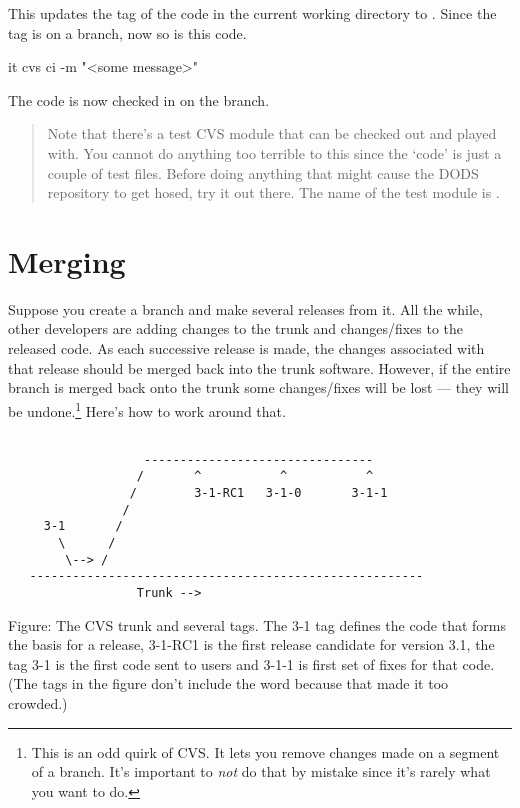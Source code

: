 \documentclass{dods-paper}
\begin{document}
This updates the tag of the code in the current working directory to
. Since the tag is on a branch, now so is this code.

\begin{vcode}{it}
cvs ci -m "<some message>"
\end{vcode}

The code is now checked in on the branch.

\begin{quote}
Note that there's a test CVS module that can be checked out and played with.
You cannot do anything too terrible to this since the `code' is just a couple
of test files. Before doing anything that might cause the DODS repository to
get hosed, try it out there. The name of the test module is .
\end{quote}

\section{Merging}
\label{sec:merge}

Suppose you create a branch and make several releases from it. All the while,
other developers are adding changes to the trunk and changes/fixes to the
released code. As each successive release is made, the changes associated
with that release should be merged back into the trunk software. However, if
the entire branch is merged back onto the trunk some changes/fixes will be
lost --- they will be undone.\footnote{This is an odd quirk of CVS. It lets
you remove changes made on a segment of a branch. It's important to
\emph{not} do that by mistake since it's rarely what you want to do.} Here's
how to work around that.

\begin{verbatim}

                   --------------------------------
                  /       ^           ^           ^
                 /        3-1-RC1   3-1-0       3-1-1
                /
     3-1       /
       \      /
        \--> /
   -------------------------------------------------------
                  Trunk -->
\end{verbatim}

Figure: The CVS trunk and several tags. The 3-1 tag defines the code that
forms the basis for a release, 3-1-RC1 is the first release candidate for
version 3.1, the tag 3-1 is the first code sent to users and 3-1-1 is first
set of fixes for that code. (The tags in the figure don't include the word
 because that made it too crowded.)
\end{document}
